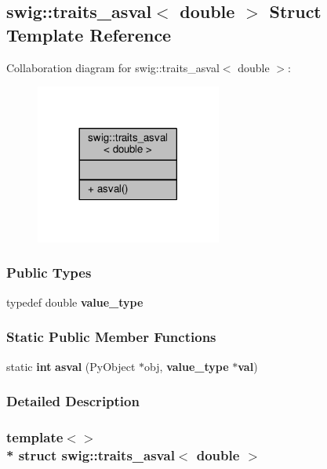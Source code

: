 \subsection{swig\+:\+:traits\+\_\+asval$<$ double $>$ Struct Template Reference}
\label{structswig_1_1traits__asval_3_01double_01_4}


Collaboration diagram for swig\+:\+:traits\+\_\+asval$<$ double $>$\+:
\nopagebreak
\begin{figure}[H]
\begin{center}
\leavevmode
\includegraphics[width=173pt]{d1/d4d/structswig_1_1traits__asval_3_01double_01_4__coll__graph}
\end{center}
\end{figure}
\subsubsection*{Public Types}
\begin{DoxyCompactItemize}
\item 
typedef double {\bf value\+\_\+type}
\end{DoxyCompactItemize}
\subsubsection*{Static Public Member Functions}
\begin{DoxyCompactItemize}
\item 
static {\bf int} {\bf asval} (Py\+Object $\ast$obj, {\bf value\+\_\+type} $\ast${\bf val})
\end{DoxyCompactItemize}


\subsubsection{Detailed Description}
\subsubsection*{template$<$$>$\\*
struct swig\+::traits\+\_\+asval$<$ double $>$}



